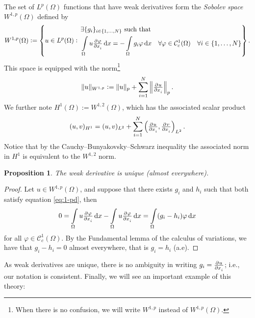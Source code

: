 \documentclass[a4paper,doc,11pt]{article}
\newtheorem{proposition}{Proposition}[theorem]
\newcommand{\CC}{\mathcal{C}}
\begin{document}
The set of \(L^p (\Omega)\) functions that have weak derivatives form the \emph{Sobolev space} \( W^{1,p} (\Omega)\) defined by
\[
    W^{1,p} (\Omega) :=
    \left\{
        u \in L^p (\Omega): \,
        \begin{aligned}
        &\exists \{g_i\}_{i\in \{1,\ldots, N\}} \text{ such that } 
        \\
        &\int\limits_\Omega u \pd{\varphi}{x_i} \dif x = -\int\limits_\Omega g_i \varphi \dif x \quad \forall \varphi \in \CC_c^1 (\Omega) \quad \forall i \in \{1,\ldots,N\}
        \end{aligned}
    \right\}.
\]
This space is equipped with the norm\footnote{When there is no confusion, we will write \(W^{1,p}\) instead of \(W^{1,p} (\Omega)\).}
\[
    \|u\|_{W^{1,p}} :=  \|u\|_p + \sum_{i=1}^N \left\| \pd{u}{x_i} \right\|_p.
\]
We further note \(H^1(\Omega) := W^{1,2}(\Omega)\), which has the associated scalar product
\[
    (u,v)_{H^1} = (u,v)_{L^2} + \sum_{i=1}^N \left( \pd{u}{x_i} , \pd{v}{x_i} \right)_{L^2}.
\]
Notice that by the Cauchy–Bunyakovsky–Schwarz inequality the associated norm in  \(H^1\) is equivalent to the \(W^{1,2}\) norm.

\begin{proposition}
    The weak derivative is unique (almost everywhere).
\end{proposition}
\begin{proof}
    Let \(u \in W^{1,p}(\Omega)\), and suppose that there exists \(g_i\) and \( h_i\) such that both satisfy equation \eqref{eq:1-pd}, then
    \[
        0 = \int\limits_\Omega u \pd{\varphi}{x_i} \dif x - \int\limits_\Omega u \pd{\varphi}{x_i} \dif x = \int\limits_\Omega (g_i - h_i) \varphi \dif x
    \]
    for all \(\varphi \in \CC_c^1 (\Omega)\). By the Fundamental lemma of the calculus of variations, we have that \( g_i - h_i = 0\) almost everywhere, that is \( g_i = h_i\) (a.e).
\end{proof}

As weak derivatives are unique, there is no ambiguity in writing \(g_i = \pd{u}{x_i}\); i.e., our notation is consistent. Finally, we will see an important example of this theory:
\end{document}
